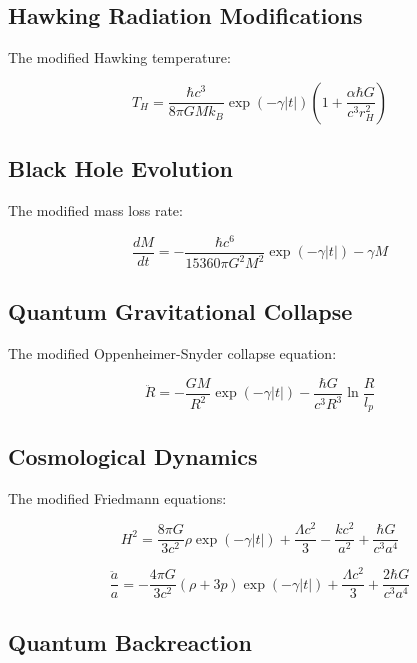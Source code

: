 \documentclass[12pt]{article}
\theoremstyle{plain}
\theoremstyle{definition}
\theoremstyle{remark}
\begin{document}
\subsection{Hawking Radiation Modifications}

The modified Hawking temperature:

\begin{equation}
T_H = \frac{\hbar c^3}{8\pi GM k_B}\exp(-\gamma|t|)\left(1 + \frac{\alpha\hbar G}{c^3r_H^2}\right)
\end{equation}

\subsection{Black Hole Evolution}

The modified mass loss rate:

\begin{equation}
\frac{dM}{dt} = -\frac{\hbar c^6}{15360\pi G^2M^2}\exp(-\gamma|t|) - \gamma M
\end{equation}

\subsection{Quantum Gravitational Collapse}

The modified Oppenheimer-Snyder collapse equation:

\begin{equation}
\ddot{R} = -\frac{GM}{R^2}\exp(-\gamma|t|) - \frac{\hbar G}{c^3R^3}\ln\frac{R}{l_p}
\end{equation}

\subsection{Cosmological Dynamics}

The modified Friedmann equations:

\begin{equation}
H^2 = \frac{8\pi G}{3c^2}\rho\exp(-\gamma|t|) + \frac{\Lambda c^2}{3} - \frac{k c^2}{a^2} + \frac{\hbar G}{c^3a^4}
\end{equation}

\begin{equation}
\frac{\ddot{a}}{a} = -\frac{4\pi G}{3c^2}(\rho + 3p)\exp(-\gamma|t|) + \frac{\Lambda c^2}{3} + \frac{2\hbar G}{c^3a^4}
\end{equation}

\subsection{Quantum Backreaction}
\end{document}
